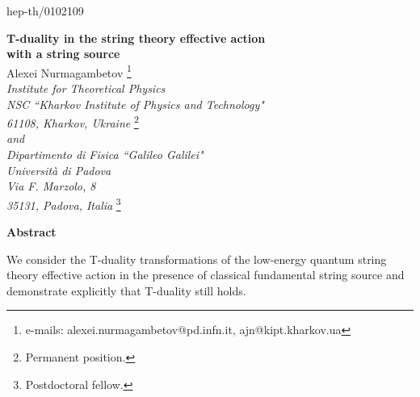 \documentclass[a4paper,11pt]{article}
\begin{document}
\def\a{\alpha}\def\b{\beta}\def\g{\gamma}\def\d{\delta}\def\e{\epsilon}
\def\k{\kappa}\def\l{\lambda}\def\L{\Lambda}\def\s{\sigma}\def\S{\Sigma}
\def\Th{\Theta}\def\th{\theta}\def\om{\omega}\def\Om{\Omega}\def\G{\Gamma}
\def\y{\vartheta}\def\m{\mu}\def\n{\nu}
\def\ws{worldsheet}
\def\susy{supersymmetry}
\def\ts{target superspace}
\def\ks{\myHighlight{$\k$}\coordHE{}--symmetry}
\providecommand{\plabel}{\label}
\renewcommand\baselinestretch{1.5}
\providecommand{\nn}{\nonumber\\}\providecommand{\p}[1]{(\ref{#1})}
\renewcommand{\thefootnote}{\arabic{footnote}}

\thispagestyle{empty}

\begin{flushright}
hep-th/0102109
\end{flushright}

\vspace*{1cm}
\begin{center}
{\Large \bf  T-duality in the string theory effective action
\\ with a string source
}
\vspace*{2cm}
\\
Alexei Nurmagambetov
\footnote{e-mails:
alexei.nurmagambetov@pd.infn.it, ajn@kipt.kharkov.ua}\\
\vspace{0.5cm}
{\it Institute for Theoretical Physics}\\
{\it NSC ``Kharkov Institute of Physics
and Technology"}\\
{\it 61108, Kharkov, Ukraine}
\footnote{Permanent position.}
\\ 
{\it and}\\
{\it Dipartimento di Fisica ``Galileo Galilei"}\\
{\it Universit\`a di Padova}\\
{\it Via F. Marzolo, 8}\\
{\it 35131, Padova, Italia}
\footnote{Postdoctoral fellow.}
\\ \bigskip




\vspace{1.5cm}
{\bf Abstract}
\end{center}

\noindent
We consider the T-duality transformations of the low-energy quantum
string theory effective action in the presence of classical fundamental 
string source and demonstrate explicitly that T-duality still holds.
\end{document}
